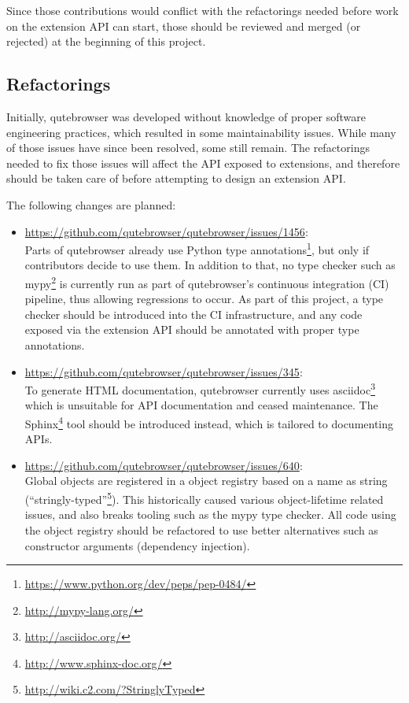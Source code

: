 Since those contributions would conflict with the refactorings needed before
work on the extension API can start, those should be reviewed and merged (or
rejected) at the beginning of this project.

\subsection{Refactorings}
\label{sec:goals-refactorings}

Initially, qutebrowser was developed without knowledge of proper software
engineering practices, which resulted in some maintainability issues. While many
of those issues have since been resolved, some still remain. The refactorings
needed to fix those issues will affect the API exposed to extensions, and
therefore should be taken care of before attempting to design an extension API.

The following changes are planned:

\begin{itemize}
  \item \url{https://github.com/qutebrowser/qutebrowser/issues/1456}: \\
    Parts of qutebrowser already use Python type
    annotations\footnote{\url{https://www.python.org/dev/peps/pep-0484/}}, but
    only if contributors decide to use them. In addition to that, no type
    checker such as mypy\footnote{\url{http://mypy-lang.org/}} is currently run
    as part of qutebrowser's continuous integration (CI) pipeline, thus allowing
    regressions to occur. As part of this project, a type checker should be
    introduced into the CI infrastructure, and any code exposed via the extension
    API should be annotated with proper type annotations.
  \item \url{https://github.com/qutebrowser/qutebrowser/issues/345}: \\
    To generate HTML documentation, qutebrowser currently uses
    asciidoc\footnote{\url{http://asciidoc.org/}} which is unsuitable for API
    documentation and ceased maintenance. The
    Sphinx\footnote{\url{http://www.sphinx-doc.org/}} tool should be
    introduced instead, which is tailored to documenting APIs.
  \item \url{https://github.com/qutebrowser/qutebrowser/issues/640}: \\
    Global objects are registered in a object registry based on a name as
    string (``stringly-typed''\footnote{\url{http://wiki.c2.com/?StringlyTyped}}).
    This historically caused various object-lifetime related issues, and also
breaks tooling such as the mypy type checker. All code using the object registry
should be refactored to use better alternatives such as constructor arguments
(dependency injection).
\end{itemize}

